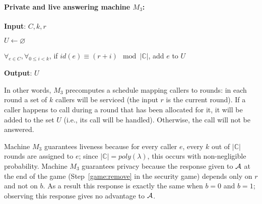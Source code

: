 \paragraph{Private and live answering machine $M_3$:}
\begin{myitemize}
\item \textbf{Input}: $C, k, r$
\item $U \leftarrow \varnothing$
\item $\forall_{e \in C}, \forall_{0 \leq i < k}$, if $id(e) \equiv (r + i) \mod{|\mathbb{C}|}$, add
  $e$ to $U$
\item \textbf{Output}: $U$
\end{myitemize}

In other words, $M_3$ precomputes a schedule mapping callers to rounds: in 
  each round a set of $k$ callers will be serviced (the input $r$ is 
  the current round).
If a caller happens to call during a round that has been allocated for it,
  it will be added to the set $U$ (i.e., its call will be handled).
Otherwise, the call will not be answered.

Machine $M_3$ guarantees liveness because for every caller $e$, every $k$ out of 
  $|\mathbb{C}|$ rounds are assigned to $e$; since 
  $|\mathbb{C}| = poly(\lambda)$, this occurs with non-negligible probability.
Machine $M_3$ guarantees privacy because the response given to $\mathcal{A}$ 
  at the end of the game (Step~\ref{game:remove} in the security game) depends 
  only on $r$ and not on $b$.
As a result this response is exactly the same when $b = 0$ and $b=1$; observing 
  this response gives no advantage to $\mathcal{A}$.
